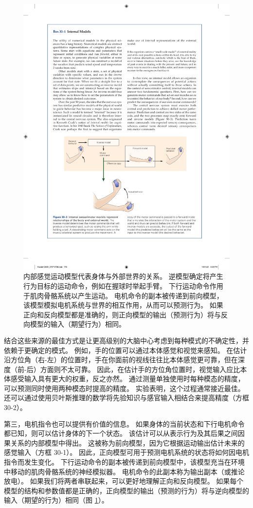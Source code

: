 \begin{figure}[htbp]
	\centering
	\includegraphics[width=0.8\linewidth]{chap30/fig_30_3}
	\caption{内部感觉运动模型代表身体与外部世界的关系。 逆模型确定将产生行为目标的运动命令，例如在握球时举起手臂。 下行运动命令作用于肌肉骨骼系统以产生运动。 电机命令的副本被传递到前向模型，该模型模拟电机系统与世界的相互作用，从而可以预测行为。 如果正向和反向模型都是准确的，则正向模型的输出（预测行为）将与反向模型的输入（期望行为）相同。}
	\label{fig:30_3}
\end{figure}


结合这些来源的最佳方式是让更高级别的大脑中心考虑到每种模式的不确定性，并依赖于更确定的模式。
例如，手的位置可以通过本体感觉和视觉来感知。
在估计沿方位角（右-左）的位置时，手在你面前的视线往往比本体感觉更可靠，但在深度（前-后）方面则不太可靠。
因此，在估计手的方位角位置时，视觉输入应比本体感受输入具有更大的权重，反之亦然。
通过测量单独使用时每种模态的精度，可以预测同时使用两种模态时提高的精度。
实验表明，这个过程通常接近最佳。 还可以通过使用贝叶斯推理的数学将先验知识与感官输入相结合来提高精度（方框 30-2）。


第三，电机指令也可以提供有价值的信息。
如果身体的当前状态和下行电机命令都已知，则可以估计身体的下一个状态。
该估计可以从表示行为及其后果之间因果关系的内部模型中得出。
这被称为前向模型，因为它根据运动输出估计未来的感觉输入（方框 30-1）。
因此，正向模型可用于预测电机系统的状态将如何因电机指令而发生变化。
下行运动命令的副本被传递到前向模型中，该模型充当在环境中移动的肌肉骨骼系统的神经模拟器。
电机命令的此副本称为输出副本（或推论放电）。
如果我们将两者串联起来，可以更好地理解正向和反向模型。
如果每个模型的结构和参数值都是正确的，正向模型的输出（预测的行为）将与逆向模型的输入（期望的行为）相同（图 \ref{fig:30_3}）。


